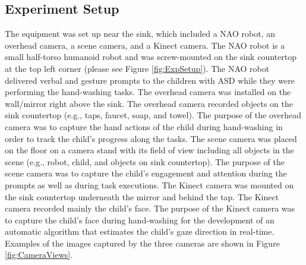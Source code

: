 \subsection{Experiment Setup}
\label{Sec:ExpSetup}
The equipment was set up near the sink, which included a NAO robot, an overhead camera, a scene camera, and a Kinect camera. The NAO robot is a small half-torso humanoid robot and was screw-mounted on the sink countertop at the top left corner (please see Figure \ref{fig:ExpSetup}). The NAO robot delivered verbal and gesture prompts to the children with ASD while they were performing the hand-washing tasks.  The overhead camera was installed on the wall/mirror right above the sink. The overhead camera recorded objects on the sink countertop (e.g., taps, faucet, soap, and towel). The purpose of the overhead camera was to capture the hand actions of the child during hand-washing in order to track the child's progress along the tasks. The scene camera was placed on the floor on a camera stand with its field of view including all objects in the scene (e.g., robot, child, and objects on sink countertop). The purpose of the scene camera was to capture the child's engagement and attention during the prompts as well as during task executions. The Kinect camera was mounted on the sink countertop underneath the mirror and behind the tap. The Kinect camera recorded mainly the child's face. The purpose of the Kinect camera was to capture the child's face during hand-washing for the development of an automatic algorithm that estimates the child's gaze direction in real-time. Examples of the images captured by the three cameras are shown in Figure \ref{fig:CameraViews}.
